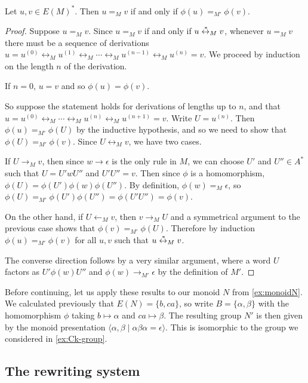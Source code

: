 \documentclass[noindex,noinsetproof,12pt]{lmaths}
\newcommand{\leftrightst}{\mathrel{\smash{\stackrel{\hspace{0.1em}\ast}{\leftrightarrow}}}}
\begin{document}
\begin{prop}
	Let $u, v \in E(M)^*$. Then $u =_M v$ if and only if $\phi(u) =_{M'} \phi(v)$. \label{prop:phi-compatible-MM'}
\end{prop}
\begin{proof}
	Suppose $u =_M v$. Since $u =_M v$ if and only if $u \leftrightst_M v$, whenever $u =_M v$ there must be a sequence of derivations $u = u^{(0)} \leftrightarrow_M u^{(1)} \leftrightarrow_M \cdots \leftrightarrow_M u^{(n-1)} \leftrightarrow_M u^{(n)} = v$. We proceed by induction on the length $n$ of the derivation.

	If $n = 0$, $u = v$ and so $\phi(u) = \phi(v)$.
	
	So suppose the statement holds for derivations of lengths up to $n$, and that $u = u^{(0)} \leftrightarrow_M \cdots \leftrightarrow_M u^{(n)} \leftrightarrow_M u^{(n+1)} = v$. Write $U = u^{(n)}$. Then $\phi(u) =_{M'} \phi(U)$ by the inductive hypothesis, and so we need to show that $\phi(U) =_{M'} \phi(v)$. Since $U \leftrightarrow_M v$, we have two cases.

	If $U \to_M v$, then since $w \to \epsilon$ is the only rule in $M$, we can choose $U'$ and $U'' \in A^*$ such that $U = U'wU''$ and $U'U'' = v$. Then since $\phi$ is a homomorphism, $\phi(U) = \phi(U')\phi(w)\phi(U'') $. By definition, $\phi(w) =_M \epsilon$, so $\phi(U) =_{M'} \phi(U')\phi(U'') = \phi(U'U'') = \phi(v)$.

	On the other hand, if $U \leftarrow_M v$, then $v \to_M U$ and a symmetrical argument to the previous case shows that $\phi(v) =_{M'} \phi(U)$. Therefore by induction $\phi(u) =_{M'} \phi(v)$ for all $u, v$ such that $u \leftrightst_M v$.


	The converse direction follows by a very similar argument, where a word $U$ factors as $U'\phi(w)U''$ and $\phi(w) \to_{M'} \epsilon$ by the definition of $M'$.
\end{proof}

Before continuing, let us apply these results to our monoid $N$ from \cref{ex:monoidN}. We calculated previously that $E(N) = \{b, ca\}$, so write $B = \{\alpha, \beta\}$ with the homomorphism $\phi$ taking $b \mapsto \alpha$ and $ca \mapsto \beta$. The resulting group $N'$ is then given by the monoid presentation $\langle \alpha, \beta \mid \alpha\beta\alpha = \epsilon \rangle$. This is isomorphic to the group we considered in \cref{ex:Ck-group}.

\subsection{The rewriting system}
\end{document}
